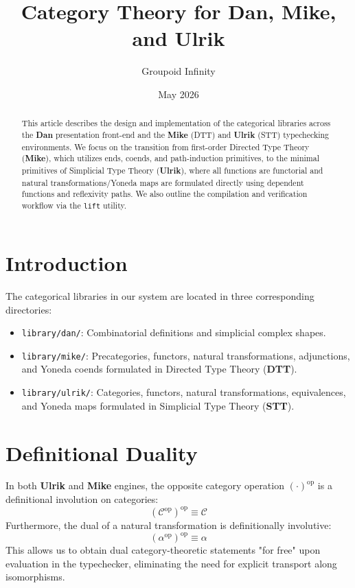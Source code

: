 \documentclass[11pt]{article}
\title{Category Theory for Dan, Mike, and Ulrik}
\author{Groupoid Infinity}
\date{May 2026}
\newcommand{\catC}{\mathcal{C}}
\newcommand{\op}{^\text{op}}
\newcommand{\dan}[0]{\textbf{Dan}}
\newcommand{\mike}[0]{\textbf{Mike}}
\newcommand{\ulrik}[0]{\textbf{Ulrik}}
\newcommand{\stt}[0]{\textbf{STT}}
\newcommand{\dtt}[0]{\textbf{DTT}}
\begin{document}
\maketitle

\begin{abstract}
This article describes the design and implementation of the categorical libraries across the \dan{} presentation front-end and the \mike{} (DTT) and \ulrik{} (STT) typechecking environments. We focus on the transition from first-order Directed Type Theory (\mike{}), which utilizes ends, coends, and path-induction primitives, to the minimal primitives of Simplicial Type Theory (\ulrik{}), where all functions are functorial and natural transformations/Yoneda maps are formulated directly using dependent functions and reflexivity paths. We also outline the compilation and verification workflow via the \texttt{lift} utility.
\end{abstract}

\tableofcontents
\newpage

\section{Introduction}

The categorical libraries in our system are located in three corresponding directories:
\begin{itemize}
    \item \texttt{library/dan/}: Combinatorial definitions and simplicial complex shapes.
    \item \texttt{library/mike/}: Precategories, functors, natural transformations, adjunctions, and Yoneda coends formulated in Directed Type Theory (\dtt{}).
    \item \texttt{library/ulrik/}: Categories, functors, natural transformations, equivalences, and Yoneda maps formulated in Simplicial Type Theory (\stt{}).
\end{itemize}

\section{Definitional Duality}

In both \ulrik{} and \mike{} engines, the opposite category operation $(\cdot)\op$ is a definitional involution on categories:
\begin{equation}
    (\catC\op)\op \equiv \catC
\end{equation}
Furthermore, the dual of a natural transformation is definitionally involutive:
\begin{equation}
    (\alpha\op)\op \equiv \alpha
\end{equation}
This allows us to obtain dual category-theoretic statements "for free" upon evaluation in the typechecker, eliminating the need for explicit transport along isomorphisms.
\end{document}
